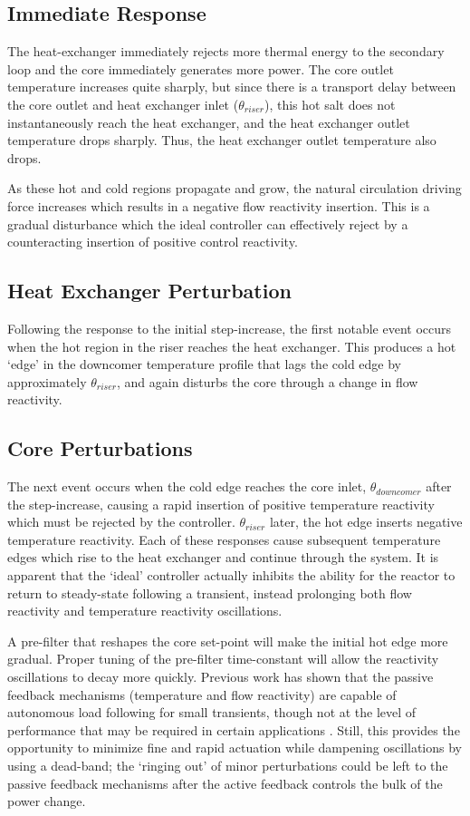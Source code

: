 \subsection{Immediate Response}
The heat-exchanger immediately rejects more thermal energy to the secondary loop and the core immediately generates more power. The core outlet temperature increases quite sharply, but since there is a transport delay between the core outlet and heat exchanger inlet ($\theta_{riser}$), this hot salt does not instantaneously reach the heat exchanger, and the heat exchanger outlet temperature drops sharply. Thus, the heat exchanger outlet temperature also drops. 

As these hot and cold regions propagate and grow, the natural circulation driving force increases which results in a negative flow reactivity insertion. This is a gradual disturbance which the ideal controller can effectively reject by a counteracting insertion of positive control reactivity. 

\subsection{Heat Exchanger Perturbation}
Following the response to the initial step-increase, the first notable event occurs when the hot region in the riser reaches the heat exchanger. This produces a hot `edge' in the downcomer temperature profile that lags the cold edge by approximately $\theta_{riser}$, and again disturbs the core through a change in flow reactivity.

\subsection{Core Perturbations}
The next event occurs when the cold edge reaches the core inlet, $\theta_{downcomer}$ after the step-increase, causing a rapid insertion of positive temperature reactivity which must be rejected by the controller. $\theta_{riser}$ later, the hot edge inserts negative temperature reactivity. Each of these responses cause subsequent temperature edges which rise to the heat exchanger and continue through the system. It is apparent that the `ideal' controller actually inhibits the ability for the reactor to return to steady-state following a transient, instead prolonging both flow reactivity and temperature reactivity oscillations.

A pre-filter that reshapes the core set-point will make the initial hot edge more gradual. Proper tuning of the pre-filter time-constant will allow the reactivity oscillations to decay more quickly. Previous work has shown that the passive feedback mechanisms (temperature and flow reactivity) are capable of autonomous load following for small transients, though not at the level of performance that may be required in certain applications \cite{CarterNumerical}. Still, this provides the opportunity to minimize fine and rapid actuation while dampening oscillations by using a dead-band; the `ringing out' of minor perturbations could be left to the passive feedback mechanisms after the active feedback controls the bulk of the power change.

